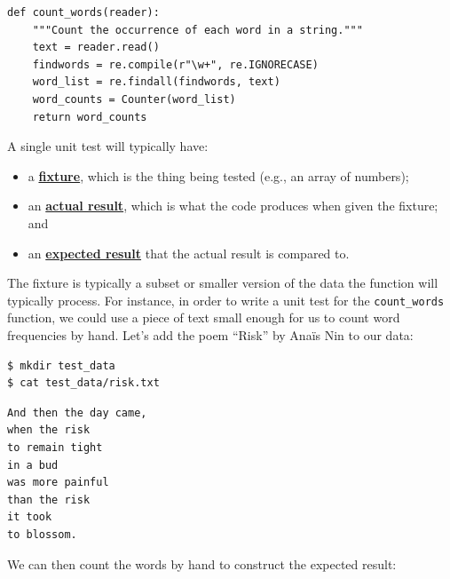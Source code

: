 \documentclass[
]{krantz}
\providecommand{\tightlist}{%
  \setlength{\itemsep}{0pt}\setlength{\parskip}{0pt}}
\newcommand{\gref}[2]{\hyperlink{#2}{\textbf{#1}}}
\begin{document}
\begin{verbatim}
def count_words(reader):
    """Count the occurrence of each word in a string."""
    text = reader.read()
    findwords = re.compile(r"\w+", re.IGNORECASE)
    word_list = re.findall(findwords, text)
    word_counts = Counter(word_list)
    return word_counts
\end{verbatim}

A single unit test will typically have:

\begin{itemize}
\tightlist
\item
  a \gref{fixture}{fixture},
  which is the thing being tested (e.g., an array of numbers);
\item
  an \gref{actual result}{actual\_result},
  which is what the code produces when given the fixture;
  and
\item
  an \gref{expected result}{expected\_result}
  that the actual result is compared to.
\end{itemize}

The fixture is typically a subset or smaller version of the data
the function will typically process.
For instance,
in order to write a unit test for the \texttt{count\_words} function,
we could use a piece of text small enough for us to count word frequencies by hand.
Let's add the poem ``Risk'' by Anaïs Nin to our data:

\begin{verbatim}
$ mkdir test_data
$ cat test_data/risk.txt
\end{verbatim}

\begin{verbatim}
And then the day came,
when the risk
to remain tight
in a bud
was more painful
than the risk
it took
to blossom.
\end{verbatim}

We can then count the words by hand to construct the expected result:
\end{document}
